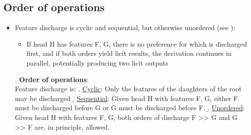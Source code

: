 \documentclass[letterpaper,10pt]{handout_nick}
\begin{document}
\subsection{Order of operations}
\begin{itemize}
\item Feature discharge is cyclic and sequential, but otherwise unordered (see \Next):
\begin{itemize}
\item If head H has features F, G, there is no preference for which is discharged first, and if both orders yield licit results, the derivation continues in parallel, potentially producing two licit outputs
\end{itemize} 
\ex. \textbf{Order of operations}:\\
Feature discharge is:
\a. \underline{Cyclic}: Only the features of the daughters of the root may be discharged
\b. \underline{Sequential}: Given head H with features F, G, either F must be discharged before G or G must be discharged before F.
\b. \underline{Unordered}: Given head H with features F, G, both orders of discharge F >> G and G >> F are, in principle, allowed.

\end{itemize}
\end{document}

